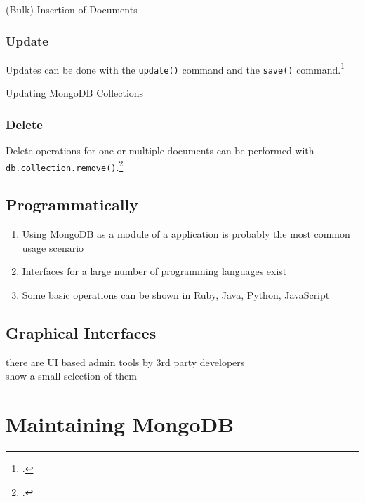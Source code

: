 \begin{code}
    \caption{(Bulk) Insertion of Documents}
    \label{lst:insertDocuments}
\end{code}

\subsubsection{Update}
Updates can be done with the \texttt{update()} command and the \texttt{save()}
command.\footcite[Cf.][p. 75 et. sqq.]{mongo_crud_manual}

\begin{code}
	\caption{Updating MongoDB Collections}
	\label{lst:updateDocuments}
\end{code}

\subsubsection{Delete}
Delete operations for one or multiple documents can be performed with
\texttt{db.collection.remove()}.\footcite[Cf.][p. 83 et.
sqq.]{mongo_crud_manual}


\subsection{Programmatically}
\label{sec:usage-programmatically}
\begin{enumerate}
  \item Using MongoDB as a module of a application is probably the most common usage scenario
  \item Interfaces for a large number of programming languages exist
  \item Some basic operations can be shown in Ruby, Java, Python, JavaScript
\end{enumerate}


\subsection{Graphical Interfaces}
\label{sec:usage-gui}
there are UI based admin tools by 3rd party developers\\
show a small selection of them

\newpage
\section{Maintaining MongoDB}
\label{sec:maintenance}

